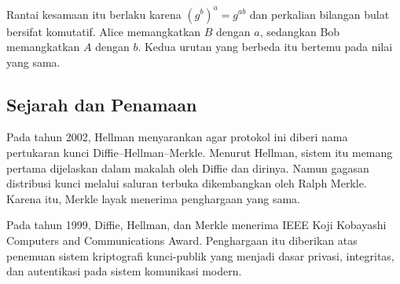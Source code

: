 Rantai kesamaan itu berlaku karena $(g^b)^a = g^{ab}$ dan perkalian bilangan
bulat bersifat komutatif. Alice memangkatkan $B$ dengan $a$, sedangkan Bob
memangkatkan $A$ dengan $b$. Kedua urutan yang berbeda itu bertemu pada nilai
yang sama.



\subsection{Sejarah dan Penamaan}

Pada tahun 2002, Hellman menyarankan agar protokol ini diberi nama pertukaran
kunci Diffie--Hellman--Merkle. Menurut Hellman, sistem itu memang pertama
dijelaskan dalam makalah oleh Diffie dan dirinya. Namun gagasan distribusi kunci
melalui saluran terbuka dikembangkan oleh Ralph Merkle. Karena itu, Merkle layak
menerima penghargaan yang sama.

Pada tahun 1999, Diffie, Hellman, dan Merkle menerima IEEE Koji Kobayashi
Computers and Communications Award. Penghargaan itu diberikan atas penemuan
sistem kriptografi kunci-publik yang menjadi dasar privasi, integritas, dan
autentikasi pada sistem komunikasi modern.
